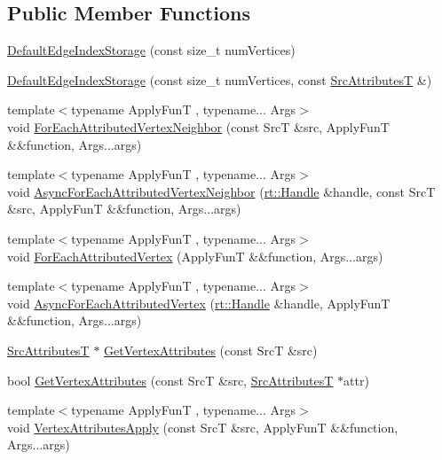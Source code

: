 \subsection*{Public Member Functions}
\begin{DoxyCompactItemize}
\item 
\hyperlink{classshad_1_1DefaultEdgeIndexStorage_a4f75c63f3ebeaf329fd9945204717de6}{Default\-Edge\-Index\-Storage} (const size\-\_\-t num\-Vertices)
\item 
\hyperlink{classshad_1_1DefaultEdgeIndexStorage_a84a6989a03534e76b1d3d32b450ff3b4}{Default\-Edge\-Index\-Storage} (const size\-\_\-t num\-Vertices, const \hyperlink{classshad_1_1DefaultEdgeIndexStorage_a70d9110c20e453941e2bfa372463bd92}{Src\-Attributes\-T} \&)
\item 
{\footnotesize template$<$typename Apply\-Fun\-T , typename... Args$>$ }\\void \hyperlink{classshad_1_1DefaultEdgeIndexStorage_ae5ac6e09a0e97a6af9fb7e6a8a225c06}{For\-Each\-Attributed\-Vertex\-Neighbor} (const Src\-T \&src, Apply\-Fun\-T \&\&function, Args...\-args)
\item 
{\footnotesize template$<$typename Apply\-Fun\-T , typename... Args$>$ }\\void \hyperlink{classshad_1_1DefaultEdgeIndexStorage_ac8ca8c25534d8eb029f7be203300cec0}{Async\-For\-Each\-Attributed\-Vertex\-Neighbor} (\hyperlink{classshad_1_1rt_1_1Handle}{rt\-::\-Handle} \&handle, const Src\-T \&src, Apply\-Fun\-T \&\&function, Args...\-args)
\item 
{\footnotesize template$<$typename Apply\-Fun\-T , typename... Args$>$ }\\void \hyperlink{classshad_1_1DefaultEdgeIndexStorage_aec43e01b0742a160886cceea83220773}{For\-Each\-Attributed\-Vertex} (Apply\-Fun\-T \&\&function, Args...\-args)
\item 
{\footnotesize template$<$typename Apply\-Fun\-T , typename... Args$>$ }\\void \hyperlink{classshad_1_1DefaultEdgeIndexStorage_af738e60ad707fef3a8f9156195d72f39}{Async\-For\-Each\-Attributed\-Vertex} (\hyperlink{classshad_1_1rt_1_1Handle}{rt\-::\-Handle} \&handle, Apply\-Fun\-T \&\&function, Args...\-args)
\item 
\hyperlink{classshad_1_1DefaultEdgeIndexStorage_a70d9110c20e453941e2bfa372463bd92}{Src\-Attributes\-T} $\ast$ \hyperlink{classshad_1_1DefaultEdgeIndexStorage_a36330090740166eee2d384282921e594}{Get\-Vertex\-Attributes} (const Src\-T \&src)
\item 
bool \hyperlink{classshad_1_1DefaultEdgeIndexStorage_a77d9d17e5d25648f5c565cac59b59264}{Get\-Vertex\-Attributes} (const Src\-T \&src, \hyperlink{classshad_1_1DefaultEdgeIndexStorage_a70d9110c20e453941e2bfa372463bd92}{Src\-Attributes\-T} $\ast$attr)
\item 
{\footnotesize template$<$typename Apply\-Fun\-T , typename... Args$>$ }\\void \hyperlink{classshad_1_1DefaultEdgeIndexStorage_a53b77f975fbc77d4ce96f5533e7ec111}{Vertex\-Attributes\-Apply} (const Src\-T \&src, Apply\-Fun\-T \&\&function, Args...\-args)
\end{DoxyCompactItemize}

